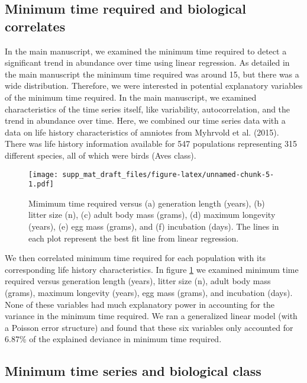 \documentclass[12pt,]{article}
\begin{document}
\pagebreak 

\subsection{Minimum time required and biological
correlates}\label{minimum-time-required-and-biological-correlates}

In the main manuscript, we examined the minimum time required to detect
a significant trend in abundance over time using linear regression. As
detailed in the main manuscript the minimum time required was around 15,
but there was a wide distribution. Therefore, we were interested in
potential explanatory variables of the minimum time required. In the
main manuscript, we examined characteristics of the time series itself,
like variability, autocorrelation, and the trend in abundance over time.
Here, we combined our time series data with a data on life history
characteristics of amniotes from Myhrvold et al. (2015). There was life
history information available for 547 populations representing 315
different species, all of which were birds (Aves class).

\begin{figure}[htbp]
\centering
\texttt{[image: supp\_mat\_draft\_files/figure-latex/unnamed-chunk-5-1.pdf]}
\caption{Mimimum time required versus (a) generation length (years), (b)
litter size (n), (c) adult body mass (grams), (d) maximum longevity
(years), (e) egg mass (grams), and (f) incubation (days). The lines in
each plot represent the best fit line from linear
regression.\label{fig:biological_correlates}}
\end{figure}

We then correlated minimum time required for each population with its
corresponding life history characteristics. In figure
\ref{fig:biological_correlates} we examined minimum time required versus
generation length (years), litter size (n), adult body mass (grams),
maximum longevity (years), egg mass (grams), and incubation (days). None
of these variables had much explanatory power in accounting for the
variance in the minimum time required. We ran a generalized linear model
(with a Poisson error structure) and found that these six variables only
accounted for 6.87\% of the explained deviance in minimum time required.

\pagebreak

\subsection{Minimum time series and biological
class}\label{minimum-time-series-and-biological-class}
\end{document}
